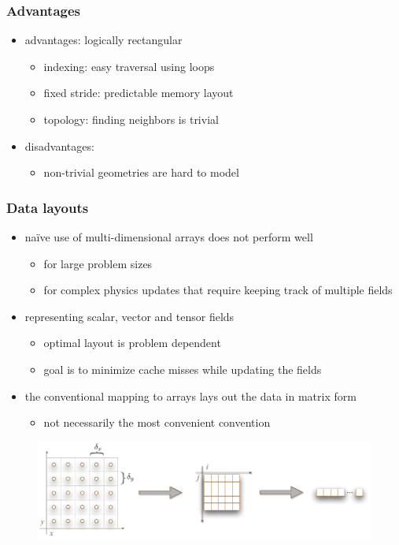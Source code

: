 \begin{frame}[fragile]
%
  \frametitle{Advantages}
%
  \begin{itemize}
%
  \item advantages: logically rectangular
    \begin{itemize}
    \item indexing: easy traversal using loops
    \item fixed stride: predictable memory layout
    \item topology: finding neighbors is trivial
    \end{itemize}
%
    \item disadvantages:
      \begin{itemize}
      \item non-trivial geometries are hard to model
      \end{itemize}
% 
  \end{itemize}
%
\end{frame}

\begin{frame}[fragile]
%
  \frametitle{Data layouts}
%
  \begin{itemize}
%
  \item na\"ive use of multi-dimensional arrays does not perform well
    \begin{itemize}
    \item for large problem sizes
    \item for complex physics updates that require keeping track of multiple fields
    \end{itemize}
%
  \item representing scalar, vector and tensor fields
    \begin{itemize}
    \item optimal layout is problem dependent
    \item goal is to minimize cache misses while updating the fields
    \end{itemize}
%
  \item the conventional mapping to arrays lays out the data in matrix form
    \begin{itemize}
    \item not necessarily the most convenient convention
    \end{itemize}
% 
  \end{itemize}
%
  \begin{figure}
    \includegraphics[scale=0.7]{figures/structured-coordinates.pdf}
  \end{figure} 
%
\end{frame}

